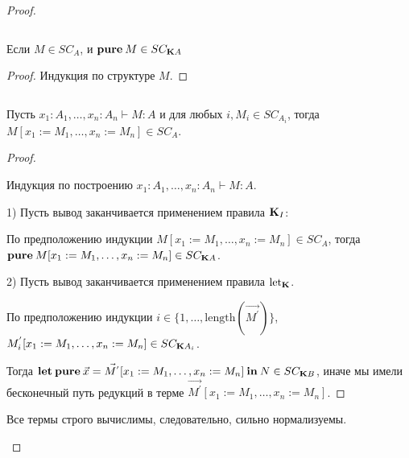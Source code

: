 \begin{proof}
\begin{lemma}
$ $

Если $M \in SC_A$, и ${\bf pure \:} M \in SC_{{\bf K}A}$
\end{lemma}

\begin{proof}

Индукция по структуре $M$.
\end{proof}

\begin{lemma}
$ $

Пусть $x_1 : A_1,\dots, x_n : A_n \vdash M : A$ и для любых $i, M_i \in SC_{A_i}$, тогда $M [x_1 := M_1,\dots,x_n := M_n] \in SC_A$.
\end{lemma}

\begin{proof}
$ $

Индукция по построению $x_1 : A_1,\dots, x_n : A_n \vdash M : A$.

1) Пусть вывод заканчивается применением правила ${\bf K}_I$:

\begin{prooftree}
\end{prooftree}

По предположению индукции $M [x_1 := M_1,\dots,x_n := M_n] \in SC_A$, тогда ${\bf pure \:} M [x_1 := M_1,\dots,x_n := M_n] \in SC_{{\bf K}A}$.

\vspace{\baselineskip}

2) Пусть вывод заканчивается применением правила $\text{let}_{\bf K}$.
\begin{prooftree}
\end{prooftree}

По предположению индукции $i \in \{ 1,\dots,\text{length}(\vec{M^{'}}) \}$, $M_i^{'} [x_1 := M_1,\dots,x_n := M_n] \in SC_{{\bf K}A_i}$.

Тогда ${\bf let \: pure \:} \vec{x} = \vec{M^{'}} [x_1 := M_1,\dots,x_n := M_n] {\: \bf in \:} N \in SC_{{\bf K} B}$,
иначе мы имели бесконечный путь редукций в терме $\vec{M^{'}} [x_1 := M_1,\dots,x_n := M_n]$.
\end{proof}

\begin{col}

Все термы строго вычислимы, следовательно, сильно нормализуемы.
\end{col}

\end{proof}

